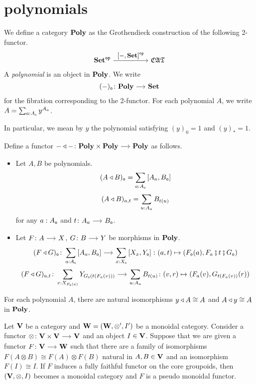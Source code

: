 \documentclass[a4paper,dvipsnames, 11pt]{amsart}
\begin{document}
\section{polynomials}
\begin{definition}
	We define a category $\mathbf{Poly}$ as the Grothendieck construction of the following 2-functor.
	\[
		\Set^\op
		\arr"\left[-,\Set\right]^\op"[][5]
		\CATbi
	\]
	A \emph{polynomial} is an object in $\mathbf{Poly}$.
	We write
	\[
		(-)_\ob\colon\Poly\arr\Set
	\]
	for the fibration corresponding to the 2-functor.
	For each polynomial $A$,
	we write $A=\sum_{a: A_{\mathtt{o}}}y^{A_a}$.

	In particular, we mean by $y$ the polynomial satisfying
	$(y)_0=1$ and $(y)_*=1$.
\end{definition}
\begin{definition}
	Define a functor $-\trleft-\colon\Poly\times\Poly\arr\Poly$ as follows.
	\begin{itemize}
		\item %
			Let $A,B$ be polynomials.
			\[
				(A\triangleleft B)_{\mathtt{o}}
				=\sum_{a: A_{\mathtt{o}}}\left[A_a,B_{\mathtt{o}}\right]
			\]
			\[
				(A\triangleleft B)_{a,t}
				=\sum_{u: A_a} B_{t(u)}
			\]
		for any
		$a: A_{\mathtt{o}}$ and $t\colon A_a\arr B_\ob$.
		\item %
			Let $F\colon A\arr X$, $G\colon B\arr Y$ be morphisms in $\mathbf{Poly}$.
			\[
				(F\trleft G)_\ob
				\colon
				\sum_{a\tcolon A_\ob}\left[A_a,B_\ob\right]
				\arr
				\sum_{x\tcolon X_\ob}\left[X_x,Y_\ob\right]
				\colon
				(a,t)\mapsto\left(F_\ob(a),F_{a}\fatsemi t\fatsemi G_{\ob}\right)
			\]
			\[
				(F\trleft G)_{a,t}\colon
				\sum_{v\tcolon X_{F_\ob(a)}}Y_{G_\ob(t(F_{a}(v)))}
				\arr
				\sum_{u\tcolon A_{a}}B_{t(u)}
				\colon
				(v,r)
				\mapsto
				(F_a(v),G_{t(F_a(v))}(r))
			\]
		\qedhere %
	\end{itemize}
\end{definition}
\begin{proposition}
	For each polynomial $A$,
	there are natural isomorphisms
	$y\triangleleft A\cong A$
	and
	$A\triangleleft y\cong A$ in $\mathbf{Poly}$.
\end{proposition}
\begin{proposition}
	\label{prop:EmbInducesMoncat}
	Let $\mathbf{V}$ be a category and $\mathbf{W}=(\mathbf{W},\otimes',I')$ be a monoidal category.
	Consider a functor $\otimes\colon\one{V}\times\one{V}\arr\one{V}$ and an object $I\in\mathbf{V}$.
	Suppose that we are given a functor $F\colon\one{V}\arr\one{W}$
	such that there are a family of isomorphisms $F(A\otimes B)\cong F(A)\otimes F(B)$ natural in $A,B\in\mathbf{V}$
	and an isomorphism $F(I)\cong I$.
	If $F$ induces a fully faithful functor on the core groupoids,
	then $(\mathbf{V},\otimes,I)$ becomes a monoidal category and $F$ is a pseudo monoidal functor.
\end{proposition}
\end{document}

